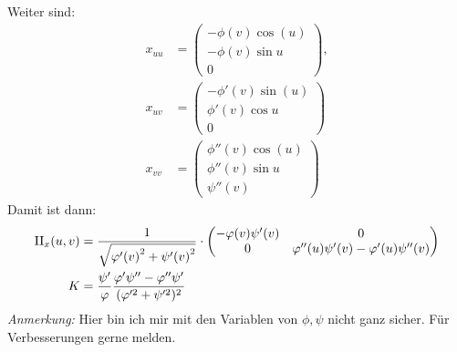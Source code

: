 \begin{solution}
\begin{enumerate}[label= (\alph*)]
\begin{equation*}
    \end{equation*}
    Weiter sind:
    \begin{align*}
      x_{uu} &= \begin{pmatrix}
        -\phi(v)\cos(u) \\
        -\phi(v) \sin u \\
        0
      \end{pmatrix}, \\
      x_{uv} &= \begin{pmatrix}
        -\phi'(v)\sin(u) \\
        \phi'(v) \cos u \\
        0
      \end{pmatrix} \\
      x_{vv} &= \begin{pmatrix}
        \phi''(v)\cos(u) \\
        \phi''(v) \sin u \\
        \psi''(v)
      \end{pmatrix} 
    \end{align*}
    Damit ist dann: 
    \begin{align*}
      \rom{2}_x(u,v) &= \frac{1}{\sqrt{ {\phi'(v)}^2 + {\psi'(v)}^2}} \cdot
      \begin{pmatrix}
        -\phi(v) \psi'(v) & 0 \\
        0 & \phi''(u) \psi'(v) - \phi'(u)\psi''(v)
      \end{pmatrix} \\ 
      K &= \frac{\psi'}{\phi}\frac{\phi'\psi''-\phi''\psi'}{(\phi'^2+\psi'^2)^{2}}
    \end{align*}
    \emph{Anmerkung:} Hier bin ich mir mit den Variablen von \( \phi, \psi \) nicht ganz sicher. Für Verbesserungen gerne melden.
    

\end{enumerate}
\end{solution}
